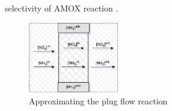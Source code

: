 selectivity of AMOX reaction \cite{jain2023diagnostics}.
\begin{figure}[ht]
    \centering
    \includegraphics[width=0.35\textwidth]{figs/2_mdl/plug_flow_discrete.png}
    \caption{Approximating the plug flow reaction}
    \label{fig:plug-flow}
\end{figure}



